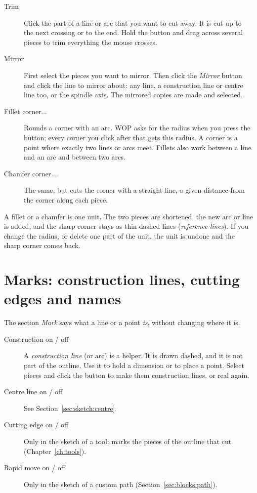 \begin{description}
\item[Trim] Click the part of a line or arc that you want to cut away. It is cut up to the next crossing or to the end. Hold the button and drag across several pieces to trim everything the mouse crosses.
\item[Mirror] First select the pieces you want to mirror. Then click the \emph{Mirror} button and click the line to mirror about: any line, a construction line or centre line too, or the spindle axis. The mirrored copies are made and selected.
\item[Fillet corner...] Rounds a corner with an arc. WOP asks for the radius when you press the button; every corner you click after that gets this radius. A corner is a point where exactly two lines or arcs meet. Fillets also work between a line and an arc and between two arcs.
\item[Chamfer corner...] The same, but cuts the corner with a straight line, a given distance from the corner along each piece.
\end{description}

A fillet or a chamfer is one unit. The two pieces are shortened, the new arc or line is added, and the sharp corner stays as thin dashed lines (\emph{reference lines}). If you change the radius, or delete one part of the unit, the unit is undone and the sharp corner comes back.

\section{Marks: construction lines, cutting edges and names}\label{sec:sketch:marks}

The section \emph{Mark} says what a line or a point \emph{is}, without changing where it is.

\begin{description}
\item[Construction on / off] A \emph{construction line} (or arc) is a helper. It is drawn dashed, and it is not part of the outline. Use it to hold a dimension or to place a point. Select pieces and click the button to make them construction lines, or real again.
\item[Centre line on / off] See Section~\ref{sec:sketch:centre}.
\item[Cutting edge on / off] Only in the sketch of a tool: marks the pieces of the outline that cut (Chapter~\ref{ch:tools}).
\item[Rapid move on / off] Only in the sketch of a custom path (Section~\ref{sec:blocks:path}).
\end{description}

